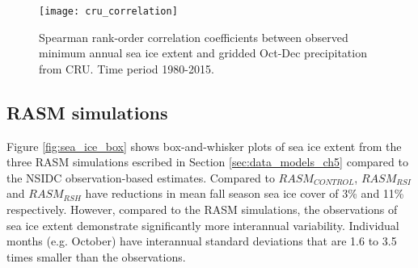 \begin{figure}
  \centering
  \texttt{[image: cru\_correlation]}
  \caption{Spearman rank-order correlation coefficients between observed minimum annual sea ice extent and gridded Oct-Dec precipitation from CRU. Time period 1980-2015.} %
  \label{fig:prec_spatial_corr}
\end{figure} %

\subsection{RASM simulations}

Figure \ref{fig:sea_ice_box} shows box-and-whisker plots of sea ice extent from the three RASM simulations escribed in Section \ref{sec:data_models_ch5} compared to the NSIDC observation-based estimates.
Compared to $RASM_{CONTROL}$, $RASM_{RSI}$ and $RASM_{RSH}$ have reductions in mean fall season sea ice cover of 3\% and 11\% respectively. %
However, compared to the RASM simulations, the observations of sea ice extent demonstrate significantly more interannual variability. %
Individual months (e.g. October) have interannual standard deviations that are 1.6 to 3.5 times smaller than the observations.

